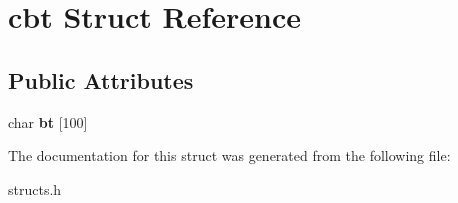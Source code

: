 \hypertarget{structcbt}{\section{cbt Struct Reference}
\label{structcbt}
}
\subsection*{Public Attributes}
\begin{DoxyCompactItemize}
\item 
\hypertarget{structcbt_acb61cec983ee9409da61c5fbb4c75749}{char {\bfseries bt} \mbox{[}100\mbox{]}}\label{structcbt_acb61cec983ee9409da61c5fbb4c75749}

\end{DoxyCompactItemize}


The documentation for this struct was generated from the following file\-:\begin{DoxyCompactItemize}
\item 
structs.\-h\end{DoxyCompactItemize}
